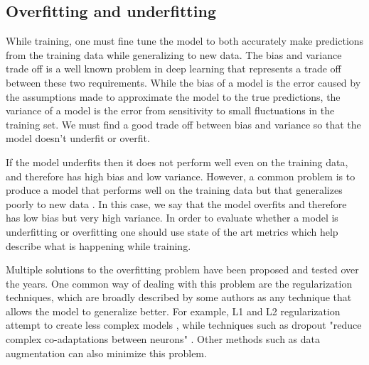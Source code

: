 \documentclass[journal,compsoc]{IEEEtran}
\begin{document}
\subsection{Overfitting and underfitting}
While training, one must fine tune the model to both accurately make predictions from the training data while generalizing to new data. The bias and variance trade off is a well known problem in deep learning that represents a trade off between these two requirements. While the bias of a model is the error caused by the assumptions made to approximate the model to the true predictions, the variance of a model is the error from sensitivity to small fluctuations in the training set. We must find a good trade off between bias and variance so that the model doesn't underfit or overfit. \par
If the model underfits then it does not perform well even on the training data, and therefore has high bias and low variance. However, a common problem is to produce a model that performs well on the training data but that generalizes poorly to new data \cite{Grus}. In this case, we say that the model overfits and therefore has low bias but very high variance. In order to evaluate whether a model is underfitting or overfitting one should use state of the art metrics which help describe what is happening while training. \par  
Multiple solutions to the overfitting problem have been proposed and tested over the years. One common way of dealing with this problem are the regularization techniques, which are broadly described by some authors as any technique that allows the model to generalize better. For example, L1 and L2 regularization attempt to create less complex models \cite{Ng}, while techniques such as dropout "reduce complex co-adaptations between neurons" \cite{Hinton2012}. Other methods such as data augmentation can also minimize this problem.
\end{document}
